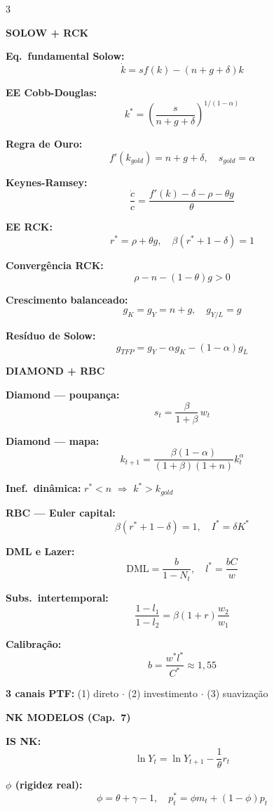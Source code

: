 \documentclass[12pt, a4paper]{article}
\begin{document}
\vspace{0.3em}
\begin{multicols}{3}

\textbf{\textcolor{cyanrbc}{SOLOW + RCK}}

\medskip
\textbf{Eq.\ fundamental Solow:}
\[
\dot{k} = sf(k) - (n+g+\delta)k
\]

\textbf{EE Cobb-Douglas:}
\[
k^* = \!\left(\frac{s}{n+g+\delta}\right)^{\!1/(1-\alpha)}
\]

\textbf{Regra de Ouro:}
\[
f'(k_{gold}) = n+g+\delta,\quad s_{gold} = \alpha
\]

\textbf{Keynes-Ramsey:}
\[
\frac{\dot{c}}{c} = \frac{f'(k)-\delta-\rho-\theta g}{\theta}
\]

\textbf{EE RCK:}
\[
r^* = \rho + \theta g,\quad \beta(r^*+1-\delta)=1
\]

\textbf{Convergência RCK:}
\[
\rho - n - (1-\theta)g > 0
\]

\textbf{Crescimento balanceado:}
\[
g_K = g_Y = n+g,\quad g_{Y/L} = g
\]

\textbf{Resíduo de Solow:}
\[
g_{TFP} = g_Y - \alpha g_K - (1-\alpha)g_L
\]

\columnbreak

\textbf{\textcolor{cyanrbc}{DIAMOND + RBC}}

\medskip
\textbf{Diamond --- poupança:}
\[
s_t = \frac{\beta}{1+\beta}\,w_t
\]

\textbf{Diamond --- mapa:}
\[
k_{t+1} = \frac{\beta(1-\alpha)}{(1+\beta)(1+n)}k_t^\alpha
\]

\textbf{Inef.\ dinâmica:} $r^* < n$ $\Rightarrow$ $k^* > k_{gold}$

\textbf{RBC --- Euler capital:}
\[
\beta(r^*+1-\delta)=1,\quad I^*=\delta K^*
\]

\textbf{DML e Lazer:}
\[
\text{DML} = \frac{b}{1-N_t},\quad l^* = \frac{bC}{w}
\]

\textbf{Subs.\ intertemporal:}
\[
\frac{1-l_1}{1-l_2} = \beta(1+r)\frac{w_2}{w_1}
\]

\textbf{Calibração:}
\[
b = \frac{w^* l^*}{C^*} \approx 1{,}55
\]

\textbf{3 canais PTF:}
(1) direto $\cdot$ (2) investimento $\cdot$ (3) suavização

\columnbreak

\textbf{\textcolor{cyanrbc}{NK MODELOS (Cap.\ 7)}}

\medskip
\textbf{IS NK:}
\[
\ln Y_t = \ln Y_{t+1} - \frac{1}{\theta}r_t
\]

\textbf{$\phi$ (rigidez real):}
\[
\phi = \theta+\gamma-1,\quad p_t^* = \phi m_t + (1-\phi)p_t
\]


\end{multicols}
\end{document}
